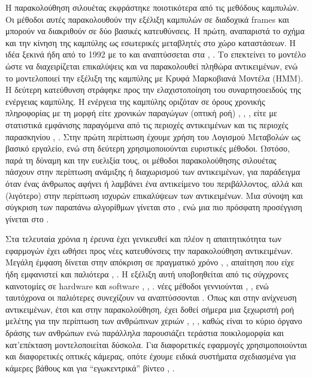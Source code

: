 \documentclass[11pt,a4paper,english,greek,twoside]{../Thesis}
\begin{document}
\par Η παρακολούθηση σιλουέτας εκφράστηκε ποιοτικότερα από τις μεθόδους καμπυλών. Οι μέθοδοι αυτές παρακολουθούν την εξέλιξη καμπυλών σε διαδοχικά frames και μπορούν να διακριθούν σε δύο βασικές κατευθύνσεις. Η πρώτη, αναπαριστά το σχήμα και την κίνηση της καμπύλης ως εσωτερικές μεταβλητές στο χώρο καταστάσεων. Η ιδέα ξεκινά ήδη από το 1992 με το \cite{terzopoulos_1992} και αναπτύσσεται στα \cite{isard_1998}, \cite{peterfreund_1999}. Το \cite{maccormick_2000} επεκτείνει το μοντέλο ώστε να διαχειρίζεται επικαλύψεις και να παρακολουθεί πληθώρα αντικειμένων, ενώ το \cite{Chen_2001} μοντελοποιεί την εξέλιξη της καμπύλης με Κρυφά Μαρκοβιανά Μοντέλα (HMM). Η δεύτερη κατεύθυνση στράφηκε προς την ελαχιστοποίηση του συναρτησοειδούς της ενέργειας καμπύλης. Η ενέργεια της καμπύλης οριζόταν σε όρους χρονικής πληροφορίας με τη μορφή είτε χρονικών παραγώγων (οπτική ροή) \cite{bertalmio_2000}, \cite{mansouri_2002}, \cite{cremers_2003}, είτε με στατιστικά εμφάνισης παραγόμενα από τις περιοχές αντικειμένων και τις περιοχές παρασκηνίου \cite{yilmaz_2004}, \cite{ronfard_1994}. Στην πρώτη περίπτωση έχουμε χρήση του Λογισμού Μεταβολών ως βασικό εργαλείο, ενώ στη δεύτερη χρησιμοποιούνται ευριστικές μέθοδοι. Ωστόσο, παρά τη δύναμη και την ευελιξία τους, οι μέθοδοι παρακολούθησης σιλουέτας πάσχουν στην περίπτωση ανάμιξης ή διαχωρισμού των αντικειμένων, για παράδειγμα όταν ένας άνθρωπος αφήνει ή λαμβάνει ένα αντικείμενο του περιβάλλοντος, αλλά και (λιγότερο) στην περίπτωση ισχυρών επικαλύψεων των αντικειμένων. Μια σύνοψη και σύγκριση των παραπάνω αλγορίθμων γίνεται στο \cite{yilmaz_2006}, ενώ μια πιο πρόσφατη προσέγγιση γίνεται στο \cite{lakshmeeswari_2016}.

\par Στα τελευταία χρόνια η έρευνα έχει γενικευθεί και πλέον η απαιτητικότητα των εφαρμογών έχει ωθήσει προς νέες κατευθύνσεις την παρακολούθηση αντικειμένων. Μεγάλη έμφαση δίνεται στην απόκριση σε πραγματικό χρόνο \cite{lei_2011}, \cite{kodjo_2012}, απαίτηση που είχε ήδη εμφανιστεί και παλιότερα \cite{comaniciu_2000}, \cite{kim_2008}. Η εξέλιξη αυτή υποβοηθείται από τις σύγχρονες καινοτομίες σε hardware και software \cite{mistree_2015}, \cite{lyu_2016}, \cite{yasukawa_2016}. νέες μέθοδοι γεννιούνται \cite{mehta_2014}, \cite{misra_2015}, ενώ ταυτόχρονα οι παλιότερες συνεχίζουν να αναπτύσσονται \cite{deori_2014}. Όπως και στην ανίχνευση αντικειμένων, έτσι και στην παρακολούθηση, έχει δοθεί σήμερα μια ξεχωριστή ροή μελέτης για την περίπτωση των ανθρώπινων χεριών \cite{chen_2014}, \cite{sridhar_2015}, \cite{sharp_2015}, καθώς είναι το κύριο όργανο δράσης των ανθρώπων ενώ παράλληλα παρουσιάζει τεράστια ποικιλομορφία και κατ'επέκταση μοντελοποιείται δύσκολα. Για διαφορετικές εφαρμογές χρησιμοποιούνται και διαφορετικές οπτικές κάμερας, οπότε έχουμε ειδικά συστήματα σχεδιασμένα για κάμερες βάθους \cite{sridhar_2016} και για “εγωκεντρικά” βίντεο \cite{li_2013_pixel}, \cite{zhu_2016}.
\end{document}
